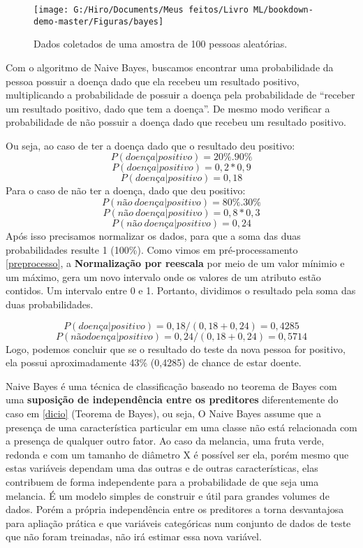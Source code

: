 \documentclass[
  openany]{book}
\begin{document}
\begin{figure}

{\centering \texttt{[image: G:/Hiro/Documents/Meus feitos/Livro ML/bookdown-demo-master/Figuras/bayes]} 

}

\caption{Dados coletados de uma amostra de 100 pessoas aleatórias.}\label{fig:bayes}
\end{figure}



Com o algoritmo de Naive Bayes, buscamos encontrar uma probabilidade da pessoa possuir a doença dado que ela recebeu um resultado positivo, multiplicando a probabilidade de possuir a doença pela probabilidade de ``receber um resultado positivo, dado que tem a doença''. De mesmo modo verificar a probabilidade de não possuir a doença dado que recebeu um resultado positivo.

Ou seja, ao caso de ter a doença dado que o resultado deu positivo:
\[P(doença|positivo) = 20\% . 90\% \] \[P(doença|positivo) = 0,2 * 0,9 \] \[P(doença|positivo) = 0,18\]
Para o caso de não ter a doença, dado que deu positivo:
\[P(não \ doença|positivo) = 80\%.30\%\]
\[P(não \ doença|positivo) = 0,8 * 0,3\]
\[P(não\ doença|positivo) = 0,24\]
Após isso precisamos normalizar os dados, para que a soma das duas probabilidades resulte 1 (100\%). Como vimos em pré-processamento \ref{preprocesso}, a \textbf{Normalização por reescala} por meio de um valor mínimio e um máximo, gera um novo intervalo onde os valores de um atributo estão contidos. Um intervalo entre 0 e 1. Portanto, dividimos o resultado pela soma das duas probabilidades.

\[P(doença|positivo) = 0,18/(0,18+0,24) = 0,4285\]
\[P(não doença|positivo) = 0,24/(0,18+0,24) = 0,5714\]
Logo, podemos concluir que se o resultado do teste da nova pessoa for positivo, ela possui aproximadamente 43\% (0,4285) de chance de estar doente.

Naive Bayes é uma técnica de classificação baseado no teorema de Bayes com uma \textbf{suposição de independência entre os preditores} diferentemente do caso em \ref{dicio} (Teorema de Bayes), ou seja, O Naive Bayes assume que a presença de uma característica particular em uma classe não está relacionada com a presença de qualquer outro fator. Ao caso da melancia, uma fruta verde, redonda e com um tamanho de diâmetro X é possível ser ela, porém mesmo que estas variáveis dependam uma das outras e de outras características, elas contribuem de forma independente para a probabilidade de que seja uma melancia. É um modelo simples de construir e útil para grandes volumes de dados. Porém a própria independência entre os preditores a torna desvantajosa para apliação prática e que variáveis categóricas num conjunto de dados de teste que não foram treinadas, não irá estimar essa nova variável.
\end{document}
